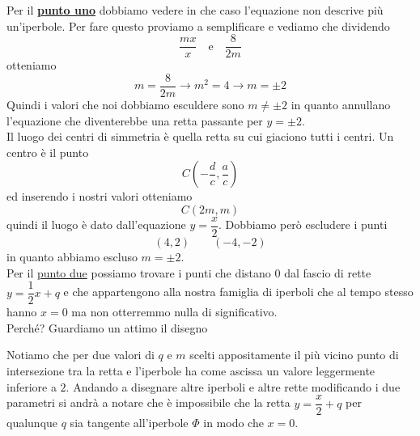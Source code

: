Per il \hyperref[enum:ex:aff:2:1]{\textbf{punto uno}} dobbiamo vedere in che caso l'equazione non
descrive più un'iperbole. Per fare questo proviamo a semplificare e vediamo che dividendo
\begin{equation*}
\frac{mx}{x} \quad \text{e} \quad \frac{8}{2m}
\end{equation*}
otteniamo
\begin{equation*}
m = \frac{8}{2m} \rightarrow m^2 = 4 \rightarrow \boxed{m=\pm2}
\end{equation*}
Quindi i valori che noi dobbiamo esculdere sono $m\neq\pm2$ in quanto annullano l'equazione che
diventerebbe una retta passante per $y=\pm2$.\\
Il luogo dei centri di simmetria è quella retta su cui giaciono tutti i centri. Un centro è il punto
\begin{equation*}
C\left(-\frac{d}{c},\frac{a}{c}\right)
\end{equation*}
ed inserendo i nostri valori otteniamo
\begin{equation*}
C(2m,m)
\end{equation*}
quindi il luogo è dato dall'equazione $\boxed{y=\dfrac{x}{2}}$. Dobbiamo però escludere i punti
\begin{equation*}
(4,2)\qquad(-4,-2)
\end{equation*}
in quanto abbiamo escluso $m=\pm2$.\\[\baselineskip]

Per il \hyperref[enum:ex:aff:2:2]{punto due} possiamo trovare i punti che distano $0$ dal fascio di
rette $y=\dfrac{1}{2}x+q$ e che appartengono alla nostra famiglia di iperboli che al tempo stesso
hanno $x=0$ ma non otterremmo nulla di significativo.\\
Perché? Guardiamo un attimo il disegno
\begin{center}
\end{center}
Notiamo che per due valori di $q$ e $m$ scelti appositamente il più vicino punto di intersezione tra 
la retta e l'iperbole ha come ascissa un valore leggermente inferiore a $2$. Andando a disegnare altre
iperboli e altre rette modificando i due parametri si andrà a notare che è impossibile che la retta
$y=\dfrac{x}{2}+q$ per qualunque $q$ sia tangente all'iperbole $\Phi$ in modo che $x=0$.\\[\baselineskip]

